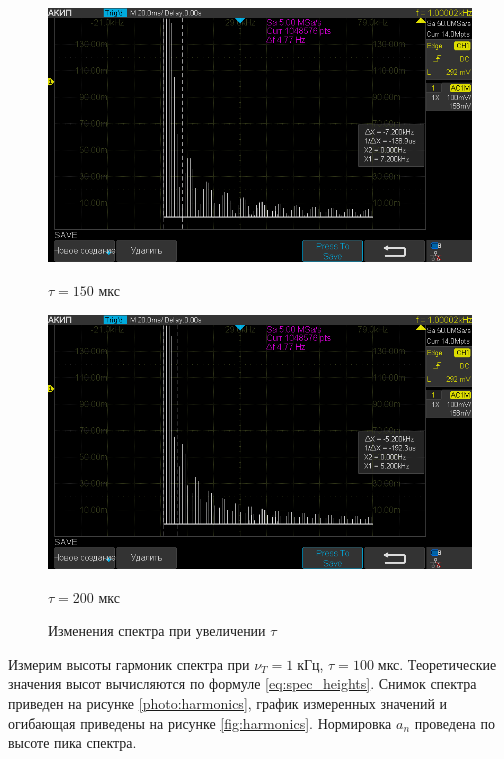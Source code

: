 \begin{figure}[H]
	\centering
	\begin{minipage}[b]{.5\textwidth}
		\centering
		\includegraphics[width=0.9\linewidth]{"../photos/impulse6.png"}
		\caption*{$\tau = 150$ мкс}
	\end{minipage}%
	\begin{minipage}[b]{.5\textwidth}
		\centering
		\includegraphics[width=0.9\linewidth]{"../photos/impulse7.png"}
		\caption*{$\tau = 200$ мкс}
	\end{minipage}
	\caption{Изменения спектра при увеличении $\tau$}
	\label{photo:impulse_tau}
\end{figure}

Измерим высоты гармоник спектра при $\nu_T = 1 \; \text{кГц}$, $\tau = 100 \; \text{мкс}$. Теоретические значения высот вычисляются по формуле \eqref{eq:spec_heights}. Снимок спектра приведен на рисунке \ref{photo:harmonics}, график измеренных значений и огибающая приведены на рисунке \ref{fig:harmonics}. Нормировка $a_n$ проведена по высоте пика спектра.

